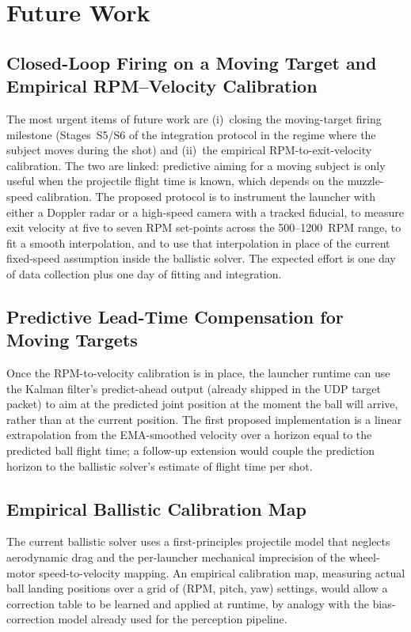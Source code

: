 \section{Future Work}

\subsection{Closed-Loop Firing on a Moving Target and Empirical RPM--Velocity Calibration}

The most urgent items of future work are (i)~closing the moving-target firing milestone (Stages~S5/S6 of the integration protocol in the regime where the subject moves during the shot) and (ii)~the empirical RPM-to-exit-velocity calibration. The two are linked: predictive aiming for a moving subject is only useful when the projectile flight time is known, which depends on the muzzle-speed calibration. The proposed protocol is to instrument the launcher with either a Doppler radar or a high-speed camera with a tracked fiducial, to measure exit velocity at five to seven RPM set-points across the 500--1200~RPM range, to fit a smooth interpolation, and to use that interpolation in place of the current fixed-speed assumption inside the ballistic solver. The expected effort is one day of data collection plus one day of fitting and integration.

\subsection{Predictive Lead-Time Compensation for Moving Targets}

Once the RPM-to-velocity calibration is in place, the launcher runtime can use the Kalman filter's predict-ahead output (already shipped in the UDP target packet) to aim at the predicted joint position at the moment the ball will arrive, rather than at the current position. The first proposed implementation is a linear extrapolation from the EMA-smoothed velocity over a horizon equal to the predicted ball flight time; a follow-up extension would couple the prediction horizon to the ballistic solver's estimate of flight time per shot.

\subsection{Empirical Ballistic Calibration Map}

The current ballistic solver uses a first-principles projectile model that neglects aerodynamic drag and the per-launcher mechanical imprecision of the wheel-motor speed-to-velocity mapping. An empirical calibration map, measuring actual ball landing positions over a grid of (RPM, pitch, yaw) settings, would allow a correction table to be learned and applied at runtime, by analogy with the bias-correction model already used for the perception pipeline.

